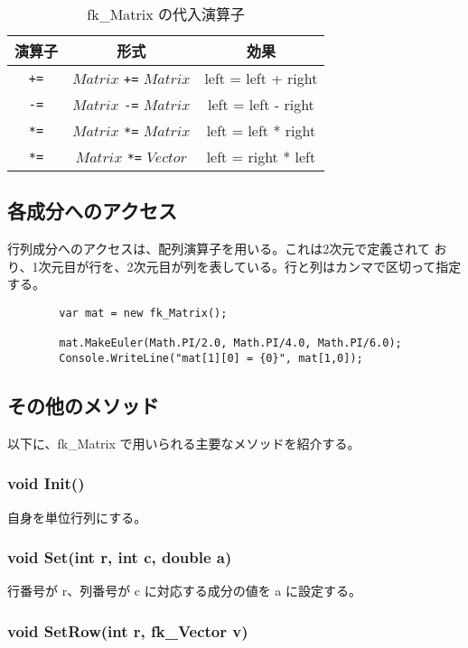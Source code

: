\begin{table}[H]
\caption{fk\_Matrix の代入演算子}
\label{tbl:fkMat3}
\begin{center}
\begin{tabular}{|c|c|c|}
\hline
演算子 & 形式 & 効果 \\ \hline \hline
\verb-+=- & \(Matrix\) \verb-+=- \(Matrix\) & left = left + right \\ \hline
\verb+-=+ & \(Matrix\) \verb+-=+ \(Matrix\) & left = left - right \\ \hline
\verb+*=+ & \(Matrix\) \verb+*=+ \(Matrix\) & left = left * right \\ \hline
\verb+*=+ & \(Matrix\) \verb+*=+ \(Vector\) & left = right * left \\ \hline
\end{tabular}
\end{center}
\end{table}
\subsection{各成分へのアクセス}
行列成分へのアクセスは、配列演算子を用いる。これは2次元で定義されて
おり、1次元目が行を、2次元目が列を表している。行と列はカンマで区切って指定する。\\
\begin{screen}
\begin{verbatim}
        var mat = new fk_Matrix();

        mat.MakeEuler(Math.PI/2.0, Math.PI/4.0, Math.PI/6.0);
        Console.WriteLine("mat[1][0] = {0}", mat[1,0]);
\end{verbatim}
\end{screen}
\subsection{その他のメソッド}
以下に、fk\_Matrix で用いられる主要なメソッドを紹介する。

\subsubsection*{void Init()}
自身を単位行列にする。

\subsubsection*{void Set(int r, int c, double a)}
行番号が r、列番号が c に対応する成分の値を a に設定する。

\subsubsection*{void SetRow(int r, fk\_Vector v)}
